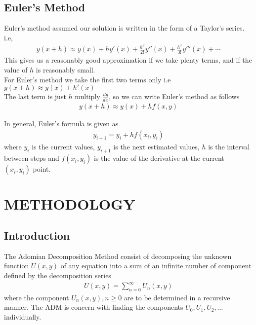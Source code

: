 \documentclass[11pt]{report}
\newcommand{\dsp}{\displaystyle}
\newcommand{\NI}{\noindent}
\newcommand{\sprime}{'}
\newcommand{\dprime}{''}
\newcommand{\tprime}{'''}
\begin{document}
	\section{Euler's Method}
	Euler's method assumed our solution is written in the form of a Taylor's series. i.e,
	\begin{eqnarray}
		y(x+h) \approx y(x) + hy\sprime(x) + \frac{h^2}{2!}y\dprime(x) + \frac{h^3}{3!}y\tprime(x) + \cdots
	\end{eqnarray}
	This gives us a reasonably good approximation if we take plenty terms, and if the value of $h$ is reasonably small. \\
	
	\NI For Euler's method we take the first two terms only i.e $\dsp y(x+h) \approx y(x) + h\sprime(x)$\\
	The last term is just $h$ multiply $\dsp\frac{dy}{dx}$, so we can write Euler's method as follows
	\begin{eqnarray}
		y(x+h) \approx y(x) + hf(x,y)
	\end{eqnarray} 

	\NI In general, Euler's formula is given as 
	\begin{eqnarray}
		y_{i+1} = y_i + hf(x_i,y_i)
	\end{eqnarray}
	where $y_i$ is the current values, $y_{i+1}$ is the next estimated values, $h$ is the interval between steps and $f(x_i,y_i)$ is the value of the derivative at the current $(x_i,y_i)$ point.
	

	
	\chapter{METHODOLOGY}
	\section{Introduction}
	The Adomian Decomposition Method consist of decomposing the unknown function $U(x,y)$ of any equation into a sum of an infinite number of component defined by the decomposition series
	\begin{eqnarray}
		U(x,y) = \sum_{n=0}^{\infty} U_n(x,y)
	\end{eqnarray}
	where the component $U_n(x,y), n\geq 0$ are to be determined in a recursive manner. The ADM is concern with finding the components $U_0, U_1, U_2,\ldots$ individually.\\
	
\end{document}
